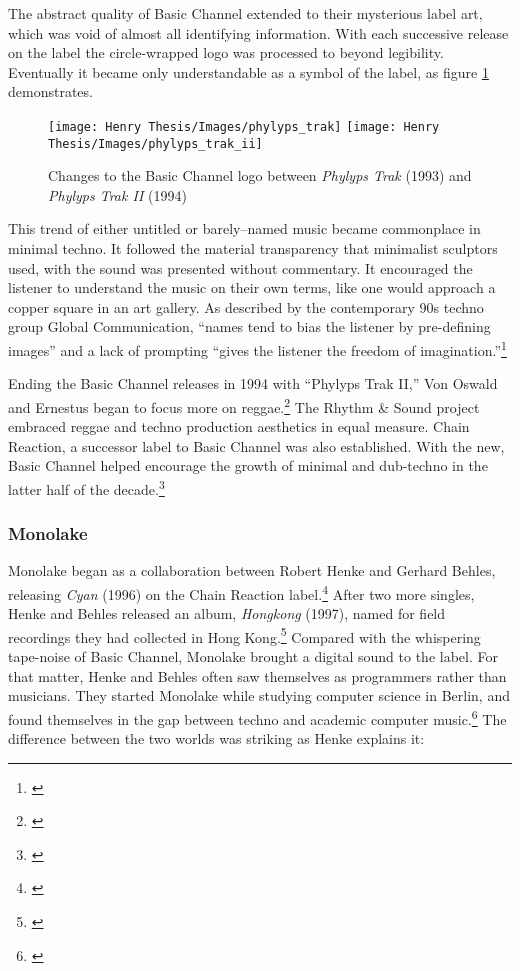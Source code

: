 \documentclass[12pt,twoside]{reedthesis}
\begin{document}
The abstract quality of Basic Channel extended to their mysterious label art, which was void of almost all identifying information. With each successive release on the label the circle-wrapped logo was processed to beyond legibility. Eventually it became only understandable as a symbol of the label, as figure \ref{fig:bclogo} demonstrates.

\begin{figure}[htbp]
\begin{centering} 
\texttt{[image: Henry Thesis/Images/phylyps\_trak]}
\texttt{[image: Henry Thesis/Images/phylyps\_trak\_ii]}
\caption{Changes to the Basic Channel logo between \emph{Phylyps Trak} (1993) and \emph{Phylyps Trak II} (1994)}
\label{fig:bclogo}
\end{centering} 
\end{figure}

This trend of either untitled or barely--named music became commonplace in minimal techno. It followed the material transparency that minimalist sculptors used, with the sound was presented without commentary. It encouraged the listener to understand the music on their own terms, like one would approach a copper square in an art gallery. As described by the contemporary 90s techno group Global Communication, ``names tend to bias the listener by pre-defining images'' and a lack of prompting ``gives the listener the freedom of imagination.''\footnote{\cite{globalcommunication76141994}}

Ending the Basic Channel releases in 1994 with ``Phylyps Trak II,'' Von Oswald and Ernestus began to focus more on reggae.\footnote{\cite{basicchannelPhylypsTrakII1994}} The Rhythm {\&} Sound project embraced reggae and techno production aesthetics in equal measure. Chain Reaction, a successor label to Basic Channel was also established. With the new, Basic Channel helped encourage the growth of minimal and dub-techno in the latter half of the decade.\footnote{\cite{maya-roisinslaterGerhardBehlesRobert2016}}

\subsubsection{Monolake}

Monolake began as a collaboration between Robert Henke and Gerhard Behles, releasing \emph{Cyan} (1996) on the Chain Reaction label.\footnote{\cite{monolakeCyan1996}} After two more singles, Henke and Behles released an album, \emph{Hongkong} (1997), named for field recordings they had collected in Hong Kong.\footnote{\cite{monolakeHongkong1997}} Compared with the whispering tape-noise of Basic Channel, Monolake brought a digital sound to the label. For that matter, Henke and Behles often saw themselves as programmers rather than musicians. They started Monolake while studying computer science in Berlin, and found themselves in the gap between techno and academic computer music.\footnote{\cite{maya-roisinslaterGerhardBehlesRobert2016}} The difference between the two worlds was striking as Henke explains it: 
\end{document}
